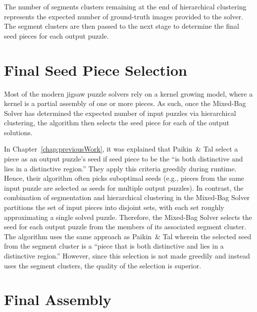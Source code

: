 The number of segments clusters remaining at the end of hierarchical clustering represents the expected number of ground-truth images provided to the solver.  The segment clusters are then passed to the next stage to determine the final seed pieces for each output puzzle.

\section{Final Seed Piece Selection}\label{sec:finalSeedPiece}

Most of the modern jigsaw puzzle solvers \cite{pomeranz2011, sholomon2013, paikin2015} rely on a kernel growing model, where a kernel is a partial assembly of one or more pieces.  As such, once the Mixed-Bag Solver has determined the expected number of input puzzles via hierarchical clustering, the algorithm then selects the seed piece for each of the output solutions. 

In Chapter~\ref{chap:previousWork}, it was explained that Paikin~\& Tal select a piece as an output puzzle's seed if seed piece to be the ``is both distinctive and lies in a distinctive region.''  They apply this criteria greedily during runtime.  Hence, their algorithm often picks suboptimal seeds (e.g., pieces from the same input puzzle are selected as seeds for multiple output puzzles).  In contrast, the combination of segmentation and hierarchical clustering in the Mixed-Bag Solver partitions the set of input pieces into disjoint sets, with each set roughly approximating a single solved puzzle.  Therefore, the Mixed-Bag Solver selects the seed for each output puzzle from the members of its associated segment cluster.  The algorithm uses the same approach as Paikin~\& Tal wherein the selected seed from the segment cluster is a ``piece that is both distinctive and lies in a distinctive region.''  However, since this selection is not made greedily and instead uses the segment clusters, the quality of the selection is superior.

\section{Final Assembly}